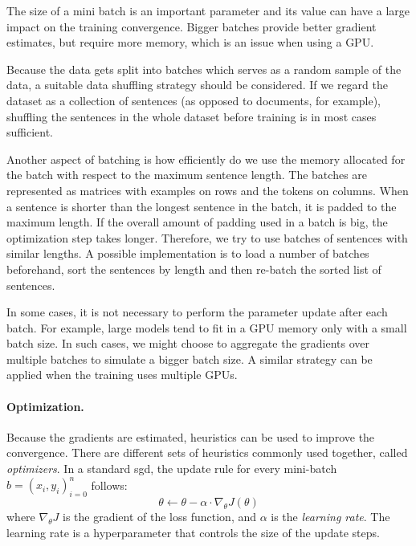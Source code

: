 The size of a mini batch is an important parameter and its value can have a
large impact on the training convergence. Bigger batches provide better
gradient estimates, but require more memory, which is an issue when using a
GPU.

Because the data gets split into batches which serves as a random sample of the
data, a suitable data shuffling strategy should be considered. If we regard the
dataset as a collection of sentences (as opposed to documents, for example),
shuffling the sentences in the whole dataset before training is in most cases
sufficient.

Another aspect of batching is how efficiently do we use the memory allocated
for the batch with respect to the maximum sentence length. The batches are
represented as matrices with examples on rows and the tokens on columns. When a
sentence is shorter than the longest sentence in the batch, it is padded to the
maximum length. If the overall amount of padding used in a batch is big, the
optimization step takes longer. Therefore, we try to use batches of sentences
with similar lengths. A possible implementation is to load a number of batches
beforehand, sort the sentences by length and then re-batch the sorted list of
sentences.

In some cases, it is not necessary to perform the parameter update after each
batch. For example, large models tend to fit in a GPU memory only with a small
batch size. In such cases, we might choose to aggregate the gradients over
multiple batches to simulate a bigger batch size. A similar strategy can be
applied when the training uses multiple GPUs.


\paragraph{Optimization.}
Because the gradients are estimated, heuristics can be used to improve the
convergence. There are different sets of heuristics commonly used together,
called \emph{optimizers}. In a standard \ac{sgd}, the update rule for every
mini-batch $b = (x_i, y_i)_{i=0}^{n}$ follows:
%
\begin{equation}
  \theta \gets \theta - \alpha  \cdot \nabla_{\theta}  J(\theta)
\end{equation}
%
where $\nabla_{\theta} J$ is the gradient of the loss function, and
$\alpha$ is the \emph{learning rate}. The learning rate is a hyperparameter
that controls the size of the update steps.

